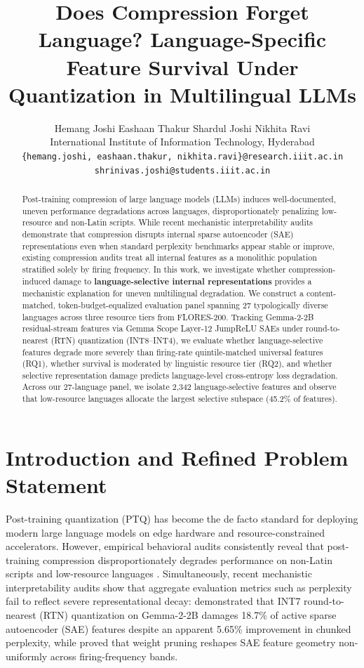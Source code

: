 \documentclass[11pt]{article}
\title{Does Compression Forget Language? Language-Specific Feature Survival Under Quantization in Multilingual LLMs}
\author{
  Hemang Joshi \quad Eashaan Thakur \quad Shardul Joshi \quad Nikhita Ravi \\
  International Institute of Information Technology, Hyderabad \\
  \texttt{\{hemang.joshi, eashaan.thakur, nikhita.ravi\}@research.iiit.ac.in} \\
  \texttt{shrinivas.joshi@students.iiit.ac.in}
}
\begin{document}
\maketitle

\begin{abstract}
Post-training compression of large language models (LLMs) induces well-documented, uneven performance degradations across languages, disproportionately penalizing low-resource and non-Latin scripts. While recent mechanistic interpretability audits demonstrate that compression disrupts internal sparse autoencoder (SAE) representations even when standard perplexity benchmarks appear stable or improve, existing compression audits treat all internal features as a monolithic population stratified solely by firing frequency. In this work, we investigate whether compression-induced damage to \textbf{language-selective internal representations} provides a mechanistic explanation for uneven multilingual degradation. We construct a content-matched, token-budget-equalized evaluation panel spanning 27 typologically diverse languages across three resource tiers from FLORES-200. Tracking Gemma-2-2B residual-stream features via Gemma Scope Layer-12 JumpReLU SAEs under round-to-nearest (RTN) quantization (INT8--INT4), we evaluate whether language-selective features degrade more severely than firing-rate quintile-matched universal features (RQ1), whether survival is moderated by linguistic resource tier (RQ2), and whether selective representation damage predicts language-level cross-entropy loss degradation. Across our 27-language panel, we isolate 2,342 language-selective features and observe that low-resource languages allocate the largest selective subspace (45.2\% of features). 

\end{abstract}

\section{Introduction and Refined Problem Statement}
Post-training quantization (PTQ) has become the de facto standard for deploying modern large language models on edge hardware and resource-constrained accelerators. However, empirical behavioral audits consistently reveal that post-training compression disproportionately degrades performance on non-Latin scripts and low-resource languages \citep{marchisio2024quantization, marie2025uneven, soualhi2026multilingual}. Simultaneously, recent mechanistic interpretability audits show that aggregate evaluation metrics such as perplexity fail to reflect severe representational decay: \citet{duan2026perplexity} demonstrated that INT7 round-to-nearest (RTN) quantization on Gemma-2-2B damages 18.7\% of active sparse autoencoder (SAE) features despite an apparent 5.65\% improvement in chunked perplexity, while \citet{borobia2026how} proved that weight pruning reshapes SAE feature geometry non-uniformly across firing-frequency bands.
\end{document}
